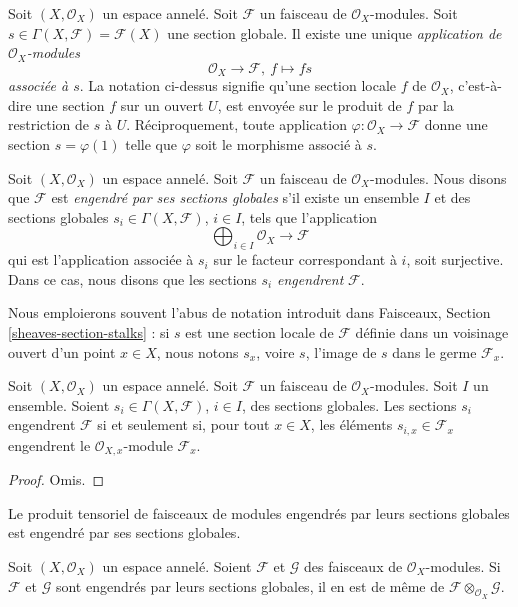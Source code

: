 \noindent
Soit $(X, \mathcal{O}_X)$ un espace annelé. Soit $\mathcal{F}$ un faisceau de
$\mathcal{O}_X$-modules. Soit
$s \in \Gamma(X, \mathcal{F}) = \mathcal{F}(X)$ une section globale. Il existe
une unique {\it application de $\mathcal{O}_X$-modules}
$$
\mathcal{O}_X \longrightarrow \mathcal{F}, \ f \longmapsto fs
$$
{\it associée à $s$}. La notation ci-dessus signifie qu'une section locale
$f$ de $\mathcal{O}_X$, c'est-à-dire une section $f$ sur un ouvert $U$, est
envoyée sur le produit de $f$ par la restriction de $s$ à $U$.
Réciproquement, toute application
$\varphi : \mathcal{O}_X \to \mathcal{F}$ donne une section
$s = \varphi(1)$ telle que $\varphi$ soit le morphisme associé à $s$.

\begin{definition}
\label{definition-globally-generated}
Soit $(X, \mathcal{O}_X)$ un espace annelé. Soit $\mathcal{F}$ un faisceau de
$\mathcal{O}_X$-modules. Nous disons que $\mathcal{F}$ est {\it engendré par
ses sections globales} s'il existe un ensemble $I$ et des sections globales
$s_i \in \Gamma(X, \mathcal{F})$, $i \in I$, tels que l'application
$$
\bigoplus\nolimits_{i \in I}
\mathcal{O}_X \longrightarrow \mathcal{F}
$$
qui est l'application associée à $s_i$ sur le facteur correspondant à $i$,
soit surjective. Dans ce cas, nous disons que les sections $s_i$
{\it engendrent} $\mathcal{F}$.
\end{definition}

\noindent
Nous emploierons souvent l'abus de notation introduit dans Faisceaux,
Section \ref{sheaves-section-stalks} : si $s$ est une section locale de
$\mathcal{F}$ définie dans un voisinage ouvert d'un point $x \in X$, nous
notons $s_x$, voire $s$, l'image de $s$ dans le germe $\mathcal{F}_x$.

\begin{lemma}
\label{lemma-globally-generated}
Soit $(X, \mathcal{O}_X)$ un espace annelé. Soit $\mathcal{F}$ un faisceau de
$\mathcal{O}_X$-modules. Soit $I$ un ensemble. Soient
$s_i \in \Gamma(X, \mathcal{F})$, $i \in I$, des sections globales. Les
sections $s_i$ engendrent $\mathcal{F}$ si et seulement si, pour tout
$x\in X$, les éléments $s_{i, x} \in \mathcal{F}_x$ engendrent le
$\mathcal{O}_{X, x}$-module $\mathcal{F}_x$.
\end{lemma}

\begin{proof}
Omis.
\end{proof}

\begin{lemma}
\label{lemma-tensor-product-globally-generated}
\begin{slogan}
Le produit tensoriel de faisceaux de modules engendrés par leurs sections
globales est engendré par ses sections globales.
\end{slogan}
Soit $(X, \mathcal{O}_X)$ un espace annelé. Soient $\mathcal{F}$ et
$\mathcal{G}$ des faisceaux de $\mathcal{O}_X$-modules. Si $\mathcal{F}$ et
$\mathcal{G}$ sont engendrés par leurs sections globales, il en est de même de
$\mathcal{F} \otimes_{\mathcal{O}_X} \mathcal{G}$.
\end{lemma}

